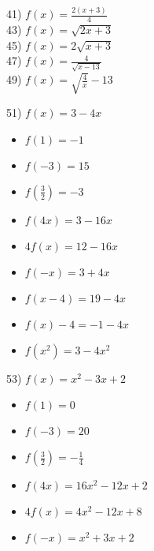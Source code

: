 \documentclass[11pt]{book}
\theoremstyle{definition}  %
\newcounter{HW}
\begin{document}


\begin{multicols}{2}
41) $f(x)=\frac{2(x+3)}{4}$\\
43) $f(x)=\sqrt{2x+3}$\\
45) $f(x)=2\sqrt{x+3}$\\
47) $f(x)=\frac{4}{\sqrt{x-13}}$\\
49) $f(x)=\sqrt{\frac{4}{x}}-13$
\end{multicols}


51) $f(x)=3-4x$
\scriptsize
\begin{multicols}{3}
\begin{itemize}
\item $f(1)=-1$
\item $f(-3)=15$
\item $f\left(\frac{3}{2} \right)=-3$
\end{itemize}
\end{multicols}

\begin{multicols}{3}
\begin{itemize}
\item  $f(4x)=3-16x$
\item $4f(x)=12-16x$
\item $f(-x)=3+4x$
\end{itemize}
\end{multicols}

\begin{multicols}{3}
\begin{itemize}
\item  $f(x-4)=19-4x$
\item $f(x) - 4=-1-4x$
\item  $f\left(x^2\right)=3-4x^2$
\end{itemize}
\end{multicols}
\normalsize

53) $f(x)=x^2-3x+2$
\scriptsize
\begin{multicols}{3}
\begin{itemize}
\item $f(1)=0$
\item $f(-3)=20$
\item $f\left(\frac{3}{2} \right)=-\frac{1}{4}$
\end{itemize}
\end{multicols}

\begin{multicols}{3}
\begin{itemize}
\item  $f(4x)=16x^2-12x+2$
\item $4f(x)=4x^2-12x+8$
\item $f(-x)=x^2+3x+2$
\end{itemize}
\end{multicols}
\end{document}
